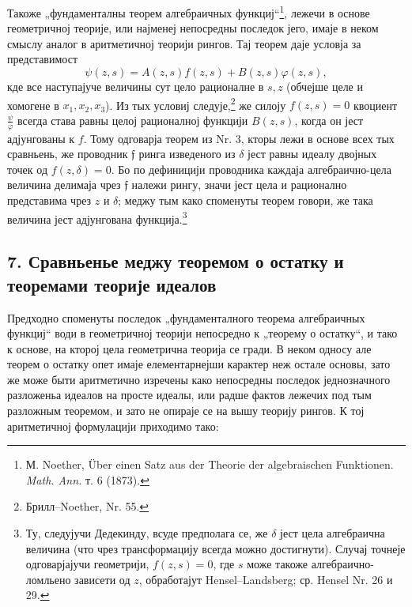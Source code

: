 ﻿\documentclass[11pt]{article}
\providecommand{\frf}{\mathfrak f}
\begin{document}
Такоже „фундаменталны теорем алгебраичных функциј“\footnote{М. Noether, Über einen Satz aus der Theorie der algebraischen Funktionen. \emph{Math. Ann.} т. 6 (1873).}, лежечи в основе геометричној теорије, или најменеј непосредны последок јего, имаје в неком смыслу аналог в аритметичној теорији рингов. Тај теорем даје условја за представимост
\[
\psi(z,s)=A(z,s)f(z,s)+B(z,s)\varphi(z,s),
\]
кде все наступајуче величины сут цело рационалне в \(s,z\) (обчејше целе и хомогене в \(x_1,x_2,x_3\)). Из тых условиј следује,\footnote{Брилл--Noether, Nr. 55.} же силоју \(f(z,s)=0\) квоциент \(\frac{\psi}{\varphi}\) всегда става равны целој рационалној функцији \(B(z,s)\), когда он јест адјунгованы к \(f\). Тому одговарја теорем из Nr. 3, кторы лежи в основе всех тых сравньень, же проводник \(\frf\) ринга изведеного из \(\delta\) јест равны идеалу двојных точек од \(f(z,\delta)=0\). Бо по дефиницији проводника каждаја алгебраично-цела величина делимаја чрез \(\frf\) належи рингу, значи јест цела и рационално представима чрез \(z\) и \(\delta\); меджу тым како споменуты теорем говори, же така величина јест адјунгована функција.\footnote{Ту, следујучи Дедекинду, всуде предполага се, же \(\delta\) јест цела алгебраична величина (что чрез трансформацију всегда можно достигнути). Случај точнеје одговарјајучи геометрији, \(f(z,s)=0\), где \(s\) може такоже алгебраично-ломльено зависети од \(z\), обработајут Hensel--Landsberg; ср. Hensel Nr. 26 и 29.}

\subsection*{7. Сравньенье меджу теоремом о остатку и теоремами теорије идеалов}
Предходно споменуты последок „фундаменталного теорема алгебраичных функциј“ води в геометричној теорији непосредно к „теорему о остатку“, и тако к основе, на кторој цела геометрична теорија се гради. В неком односу але теорем о остатку опет имаје елементарнејши карактер неж остале основы, зато же може быти аритметично изречены како непосредны последок једнозначного разложеньа идеалов на просте идеалы, или радше фактов лежечих под тым разложным теоремом, и зато не опираје се на вышу теорију рингов. К тој аритметичној формулацији приходимо тако:
\end{document}
